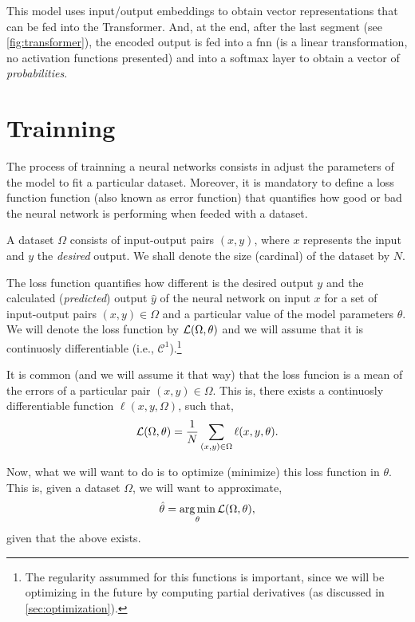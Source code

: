 This model uses input/output embeddings to obtain vector representations that
can be fed into the Transformer. And, at the end, after the last segment (see
\vref{fig:transformer}), the encoded output is fed into a \gls{fnn} (is a
linear transformation, no activation functions presented) and into a softmax
layer to obtain a vector of \emph{probabilities}.



\section{Trainning}

The process of trainning a neural networks consists in adjust the parameters of
the model to fit a particular dataset. Moreover, it is mandatory to define a
loss function function (also known as error function) that quantifies how good
or bad the neural network is performing when feeded with a dataset.

A dataset \(\Omega\) consists of input-output pairs \((x, y)\), where \(x\)
represents the input and \(y\) the \emph{desired} output. We shall denote the
size (cardinal) of the dataset by \(N\).

The loss function quantifies how different is the desired output \(y\) and the
calculated (\emph{predicted}) output \(\hat{y}\) of the neural network on input
\(x\) for a set of input-output pairs \((x , y) \in \Omega\) and a particular
value of the model parameters \(\theta\). We will denote the loss function by
\(\mathcal{L} (\Omega, \theta)\) and we will assume that it is continuosly
differentiable (i.e., \(\mathcal{C}^1\)).\footnote{The regularity assummed for
  this functions is important, since we will be optimizing in the future by
  computing partial derivatives (as discussed in \vref{sec:optimization}).}

It is common (and we will assume it that way) that the loss funcion is a mean
of the errors of a particular pair \((x, y) \in \Omega\). This is, there exists
a continuosly differentiable function \(\ell (x, y, \Omega)\), such that,
\begin{equation} \label{eq:loss}
  \mathcal{L}(\Omega, \theta) =
  \frac{1}{N} \sum_{(x, y) \in \Omega} \ell (x, y, \theta).
\end{equation}

Now, what we will want to do is to optimize (minimize) this loss function in
\(\theta\). This is, given a dataset \(\Omega\), we will want to approximate,
\begin{equation}
  \hat{\theta} = \operatorname*{arg\,min}_{\theta} \mathcal{L}(\Omega, \theta),
\end{equation}
given that the above exists.


